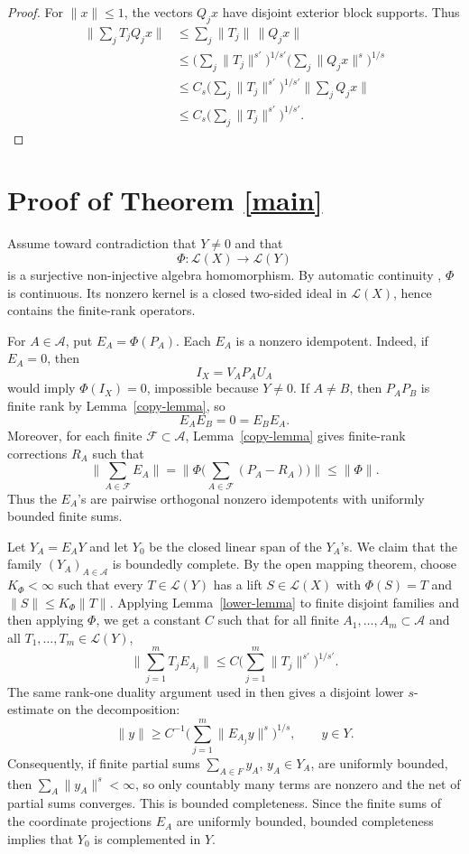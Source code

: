 \documentclass[11pt]{article}
\newcommand{\Lop}{\mathcal L}
\begin{document}
\begin{proof}
For \(\|x\|\le1\), the vectors \(Q_jx\) have disjoint exterior block supports.
Thus
\[
\begin{aligned}
\Big\|\sum_j T_jQ_jx\Big\|
&\le \sum_j \|T_j\|\,\|Q_jx\|  \\
&\le \Big(\sum_j\|T_j\|^{s'}\Big)^{1/s'}
     \Big(\sum_j\|Q_jx\|^s\Big)^{1/s}  \\
&\le C_s\Big(\sum_j\|T_j\|^{s'}\Big)^{1/s'}
     \Big\|\sum_j Q_jx\Big\|  \\
&\le C_s\Big(\sum_j\|T_j\|^{s'}\Big)^{1/s'}.
\end{aligned}
\]
\end{proof}

\section*{Proof of Theorem \ref{main}}

Assume toward contradiction that \(Y\ne0\) and that
\[
  \Phi:\Lop(X)\longrightarrow \Lop(Y)
\]
is a surjective non-injective algebra homomorphism.  By automatic continuity
\cite{JPS,Dales}, \(\Phi\) is continuous.  Its nonzero kernel is a closed
two-sided ideal in \(\Lop(X)\), hence contains the finite-rank operators.

For \(A\in\mathcal A\), put \(E_A=\Phi(P_A)\).  Each \(E_A\) is a nonzero
idempotent.  Indeed, if \(E_A=0\), then
\[
  I_X=V_AP_AU_A
\]
would imply \(\Phi(I_X)=0\), impossible because \(Y\ne0\).  If \(A\ne B\),
then \(P_AP_B\) is finite rank by Lemma~\ref{copy-lemma}, so
\[
  E_AE_B=0=E_BE_A.
\]
Moreover, for each finite \(\mathcal F\subset\mathcal A\), Lemma~\ref{copy-lemma}
gives finite-rank corrections \(R_A\) such that
\[
  \Big\|\sum_{A\in\mathcal F}E_A\Big\|
  =
  \Big\|\Phi\Big(\sum_{A\in\mathcal F}(P_A-R_A)\Big)\Big\|
  \le \|\Phi\|.
\]
Thus the \(E_A\)'s are pairwise orthogonal nonzero idempotents with uniformly
bounded finite sums.

Let \(Y_A=E_AY\) and let \(Y_0\) be the closed linear span of the \(Y_A\)'s.
We claim that the family \((Y_A)_{A\in\mathcal A}\) is boundedly complete.
By the open mapping theorem, choose \(K_\Phi<\infty\) such that every
\(T\in\Lop(Y)\) has a lift \(S\in\Lop(X)\) with \(\Phi(S)=T\) and
\(\|S\|\le K_\Phi\|T\|\).  Applying Lemma~\ref{lower-lemma} to finite disjoint
families and then applying \(\Phi\), we get a constant \(C\) such that for all
finite \(A_1,\ldots,A_m\subset\mathcal A\) and all
\(T_1,\ldots,T_m\in\Lop(Y)\),
\[
  \Big\|\sum_{j=1}^m T_jE_{A_j}\Big\|
  \le C\Big(\sum_{j=1}^m\|T_j\|^{s'}\Big)^{1/s'}.
\]
The same rank-one duality argument used in \cite[Theorem 1.1]{JPS} then gives
a disjoint lower \(s\)-estimate on the decomposition:
\[
  \|y\|\ge C^{-1}
  \Big(\sum_{j=1}^m \|E_{A_j}y\|^s\Big)^{1/s},
  \qquad y\in Y.
\]
Consequently, if finite partial sums \(\sum_{A\in F}y_A\), \(y_A\in Y_A\), are
uniformly bounded, then \(\sum_A\|y_A\|^s<\infty\), so only countably many
terms are nonzero and the net of partial sums converges.  This is bounded
completeness.  Since the finite sums of the coordinate projections \(E_A\) are
uniformly bounded, bounded completeness implies that \(Y_0\) is complemented
in \(Y\).
\end{document}
